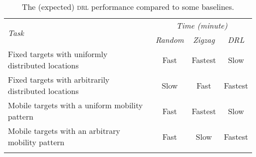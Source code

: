 \begin{table}[H]
    \centering
    \caption{The (expected) \textsc{drl} performance
    compared to some baselines.}
    \label{tab:benchmark}
    \begin{tabularx}{1.0\textwidth}{ X c c c }
        \toprule
        \multirow{2}{*}{\textit{Task}}
        & \multicolumn{3}{c}{\textit{Time (minute)}}
        \\
        & \textit{Random} 
        & \textit{Zigzag}
        & \textit{DRL}
        \\

        \midrule
        \addlinespace

        Fixed targets with uniformly distributed locations
        & Fast & Fastest & Slow     
        \\ \addlinespace
        Fixed targets with arbitrarily distributed locations
        & Slow & Fast & Fastest   
        \\ \addlinespace
        Mobile targets with a uniform mobility pattern
        & Fast & Fastest & Slow
        \\ \addlinespace
        Mobile targets with an arbitrary mobility pattern
        & Fast & Slow & Fastest
        \\ \addlinespace

        \bottomrule
    \end{tabularx}
\end{table}
